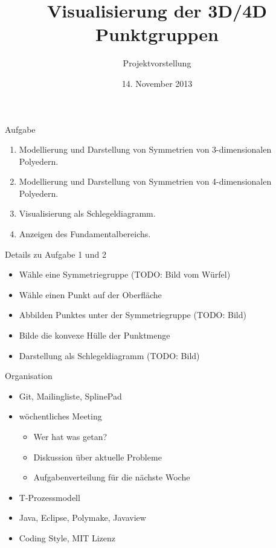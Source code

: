 \documentclass[ucs,11pt]{beamer}
\title[Punktgruppen]{Visualisierung der 3D/4D Punktgruppen}
\subtitle{Projektvorstellung}
\institute[FU Berlin]{Freie Universität Berlin}
\date[14.11.2013]{14. November 2013}
\begin{document}
\begin{frame}[plain]
	\titlepage
\end{frame}

\begin{frame}{Aufgabe}
	\begin{enumerate}
	\item Modellierung und Darstellung von Symmetrien von 3-dimensionalen Polyedern. 
	\item Modellierung und Darstellung von Symmetrien von 4-dimensionalen Polyedern. 
	\item Visualisierung als Schlegeldiagramm.
	\item Anzeigen des Fundamentalbereichs.
	\end{enumerate}
\end{frame}


\begin{frame}{Details zu Aufgabe 1 und 2}
	\begin{itemize}
	\item Wähle eine Symmetriegruppe (TODO: Bild vom Würfel)
	\item Wähle einen Punkt auf der Oberfläche
	\item Abbilden Punktes unter der Symmetriegruppe (TODO: Bild)
	\item Bilde die konvexe Hülle der Punktmenge
	\item Darstellung als Schlegeldiagramm (TODO: Bild)	
	\end{itemize}
\end{frame}

\begin{frame}{Organisation}
  	\begin{itemize}
   	 \item Git, Mailingliste, SplinePad
    	\item wöchentliches Meeting
		\begin{itemize}
		\item Wer hat was getan?
		\item Diskussion über aktuelle Probleme
		\item Aufgabenverteilung für die nächste Woche
		\end{itemize}
    	\item T-Prozessmodell
    	\item Java, Eclipse, Polymake, Javaview
	\item Coding Style, MIT Lizenz
  	\end{itemize}
\end{frame}
\end{document}
